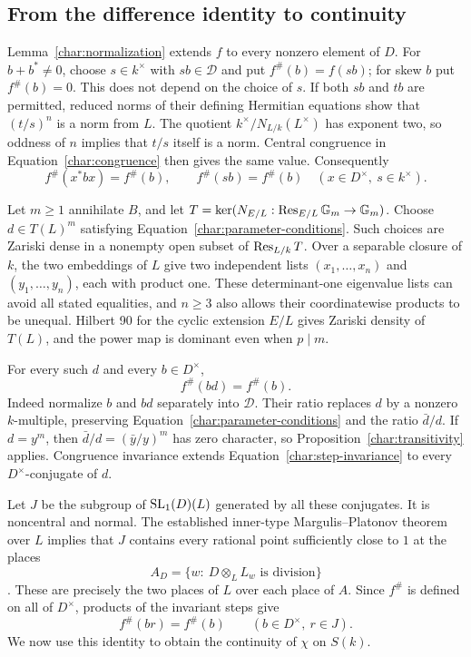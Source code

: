 \subsection{From the difference identity to continuity}

Lemma~\ref{char:normalization} extends $f$ to every nonzero element of
$D$. For $b+b^*\ne0$, choose $s\in k^\times$ with $sb\in\mathcal D$
and put $f^\#(b)=f(sb)$; for skew $b$ put $f^\#(b)=0$.
This does not depend on the choice of $s$. If both $sb$ and $tb$ are
permitted, reduced norms of their defining Hermitian equations show
that $(t/s)^n$ is a norm from $L$. The quotient
$k^\times/N_{L/k}(L^\times)$ has exponent two, so oddness of $n$
implies that $t/s$ itself is a norm. Central congruence in
Equation~\ref{char:congruence} then gives the same value.
Consequently
\begin{equation}\label{char:sharp-invariance}
 f^\#(x^*bx)=f^\#(b),\qquad f^\#(sb)=f^\#(b)
 \quad(x\in D^\times,\ s\in k^\times).
\end{equation}

Let $m\geq1$ annihilate $B$, and let
$T=\ker(N_{E/L}:\operatorname{Res}_{E/L}\mathbb G_m\to\mathbb G_m)$.
Choose $d\in T(L)^m$ satisfying
Equation~\ref{char:parameter-conditions}. Such choices are Zariski
dense in a nonempty open subset of $\operatorname{Res}_{L/k}T$. Over a separable
closure of $k$, the two embeddings of $L$ give two independent
lists $(x_1,\ldots,x_n)$ and $(y_1,\ldots,y_n)$, each with product
one. These determinant-one eigenvalue lists can avoid all
stated equalities, and $n\geq3$ also allows their coordinatewise
products to be unequal. Hilbert 90 for the cyclic extension $E/L$
gives Zariski density of $T(L)$, and the power map is dominant even
when $p\mid m$.

For every such $d$ and every $b\in D^\times$,
\begin{equation}\label{char:step-invariance}
 f^\#(bd)=f^\#(b).
\end{equation}
Indeed normalize $b$ and $bd$ separately into $\mathcal D$.
Their ratio replaces $d$ by a nonzero $k$-multiple, preserving
Equation~\ref{char:parameter-conditions} and the ratio $\bar d/d$.
If $d=y^m$, then $\bar d/d=(\bar y/y)^m$ has zero character, so
Proposition~\ref{char:transitivity} applies. Congruence invariance
extends Equation~\ref{char:step-invariance} to every
$D^\times$-conjugate of $d$.

Let $J$ be the subgroup of $\operatorname{SL}_1(D)(L)$ generated by all these
conjugates. It is noncentral and normal. The established inner-type
Margulis--Platonov theorem over $L$ implies that $J$ contains every
rational point sufficiently close to $1$ at the places
\[
 A_D=\{w:\ D\otimes_L L_w\text{ is division}\}
\]
\cite[Sections~3.4--3.5]{PRsurvey}\cite{Rapinchuk2006}.
These are precisely the two places of $L$ over each place of $A$.
Since $f^\#$ is defined on all of $D^\times$, products of the
invariant steps give
\begin{equation}\label{char:inner-invariance}
 f^\#(br)=f^\#(b)\qquad(b\in D^\times,\ r\in J).
\end{equation}
We now use this identity to obtain the continuity of $\chi$ on $S(k)$.


